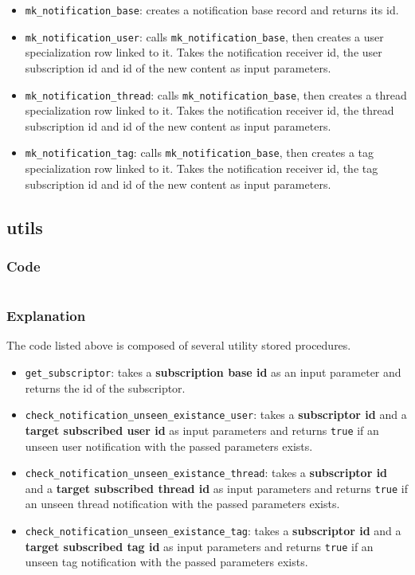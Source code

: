 \documentclass[12pt]{report}
\renewcommand\emph{\textbf}
\newcommand{\printSQLtest}[1]
{
    \inputminted[linenos, breaklines, breakbytoken, tabsize=4, fontsize=\footnotesize]{mysql}{#1}
}
\newcommand{\printSQLTablepage}[2]
{    
    \subsection{#2}
    \subsubsection{Code}
    \printSQLtest{../sql/parts/#1}
    \subsubsection{Explanation}
}
\begin{document}
                    \begin{itemize}
                        \item \texttt{mk_notification_base}: creates a notification base record and returns its id.
                         \item \texttt{mk_notification_user}: calls \texttt{mk_notification_base}, then creates a user specialization row linked to it.
                        Takes the notification receiver id, the user subscription id and id of the new content as input parameters.
                        \item \texttt{mk_notification_thread}: calls \texttt{mk_notification_base}, then creates a thread specialization row linked to it.
                        Takes the notification receiver id, the thread subscription id and id of the new content as input parameters.
                        \item \texttt{mk_notification_tag}: calls \texttt{mk_notification_base}, then creates a tag specialization row linked to it.
                        Takes the notification receiver id, the tag subscription id and id of the new content as input parameters.
                    \end{itemize}

                \newpage

                \printSQLTablepage{24_procsUtils.sql}{utils}
                    The code listed above is composed of several utility stored procedures.

                    \begin{itemize}
                        \item \texttt{get_subscriptor}: takes a \emph{subscription base id} as an input parameter and returns the id of the subscriptor.
                        \item \texttt{check_notification_unseen_existance_user}: takes a \emph{subscriptor id} and a \emph{target subscribed user id} as input parameters and returns \texttt{true} if an unseen user notification with the passed parameters exists.
                        \item \texttt{check_notification_unseen_existance_thread}: takes a \emph{subscriptor id} and a \emph{target subscribed thread id} as input parameters and returns \texttt{true} if an unseen thread notification with the passed parameters exists.
                        \item \texttt{check_notification_unseen_existance_tag}: takes a \emph{subscriptor id} and a \emph{target subscribed tag id} as input parameters and returns \texttt{true} if an unseen tag notification with the passed parameters exists.                        
                    \end{itemize}
\end{document}
